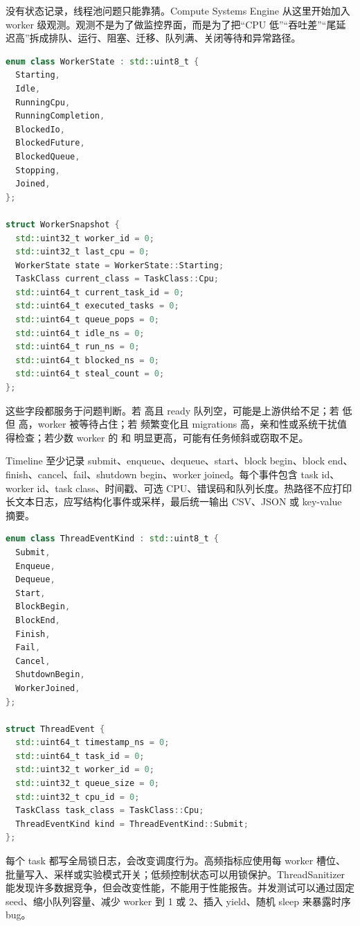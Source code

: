 没有状态记录，线程池问题只能靠猜。Compute Systems Engine 从这里开始加入 worker 级观测。观测不是为了做监控界面，而是为了把“CPU 低”“吞吐差”“尾延迟高”拆成排队、运行、阻塞、迁移、队列满、关闭等待和异常路径。

\begin{lstlisting}[language=C++,caption={WorkerSnapshot：线程池排障的最小证据}]
enum class WorkerState : std::uint8_t {
  Starting,
  Idle,
  RunningCpu,
  RunningCompletion,
  BlockedIo,
  BlockedFuture,
  BlockedQueue,
  Stopping,
  Joined,
};

struct WorkerSnapshot {
  std::uint32_t worker_id = 0;
  std::uint32_t last_cpu = 0;
  WorkerState state = WorkerState::Starting;
  TaskClass current_class = TaskClass::Cpu;
  std::uint64_t current_task_id = 0;
  std::uint64_t executed_tasks = 0;
  std::uint64_t queue_pops = 0;
  std::uint64_t idle_ns = 0;
  std::uint64_t run_ns = 0;
  std::uint64_t blocked_ns = 0;
  std::uint64_t steal_count = 0;
};
\end{lstlisting}

这些字段都服务于问题判断。若  高且 ready 队列空，可能是上游供给不足；若  低但  高，worker 被等待占住；若  频繁变化且 migrations 高，亲和性或系统干扰值得检查；若少数 worker 的  和  明显更高，可能有任务倾斜或窃取不足。

Timeline 至少记录 submit、enqueue、dequeue、start、block begin、block end、finish、cancel、fail、shutdown begin、worker joined。每个事件包含 task id、worker id、task class、时间戳、可选 CPU、错误码和队列长度。热路径不应打印长文本日志，应写结构化事件或采样，最后统一输出 CSV、JSON 或 key-value 摘要。

\begin{lstlisting}[language=C++,caption={ThreadTimeline 事件的示例形态}]
enum class ThreadEventKind : std::uint8_t {
  Submit,
  Enqueue,
  Dequeue,
  Start,
  BlockBegin,
  BlockEnd,
  Finish,
  Fail,
  Cancel,
  ShutdownBegin,
  WorkerJoined,
};

struct ThreadEvent {
  std::uint64_t timestamp_ns = 0;
  std::uint64_t task_id = 0;
  std::uint32_t worker_id = 0;
  std::uint32_t queue_size = 0;
  std::uint32_t cpu_id = 0;
  TaskClass task_class = TaskClass::Cpu;
  ThreadEventKind kind = ThreadEventKind::Submit;
};
\end{lstlisting}

每个 task 都写全局锁日志，会改变调度行为。高频指标应使用每 worker 槽位、批量写入、采样或实验模式开关；低频控制状态可以用锁保护。ThreadSanitizer 能发现许多数据竞争，但会改变性能，不能用于性能报告。并发测试可以通过固定 seed、缩小队列容量、减少 worker 到 1 或 2、插入 yield、随机 sleep 来暴露时序 bug。

